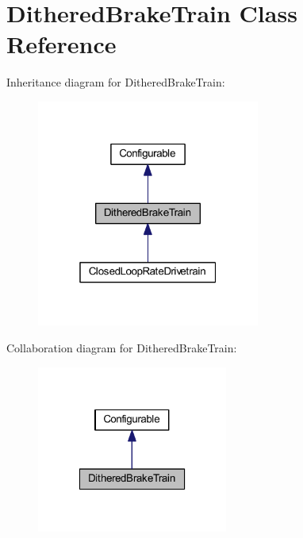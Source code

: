 \hypertarget{class_dithered_brake_train}{
\section{\-Dithered\-Brake\-Train \-Class \-Reference}
\label{class_dithered_brake_train}
}


\-Inheritance diagram for \-Dithered\-Brake\-Train\-:\nopagebreak
\begin{figure}[H]
\begin{center}
\leavevmode
\includegraphics[width=208pt]{class_dithered_brake_train__inherit__graph}
\end{center}
\end{figure}


\-Collaboration diagram for \-Dithered\-Brake\-Train\-:\nopagebreak
\begin{figure}[H]
\begin{center}
\leavevmode
\includegraphics[width=178pt]{class_dithered_brake_train__coll__graph}
\end{center}
\end{figure}
